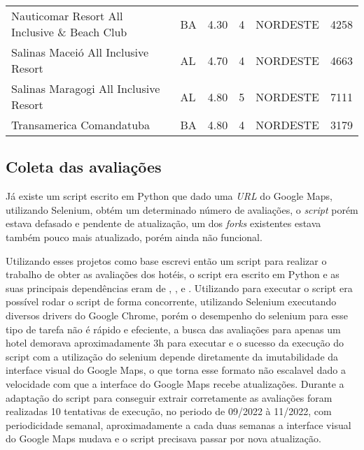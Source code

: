 \begin{table}[H]
{\begin{tabular}{llrrlr}
			Nauticomar Resort All Inclusive \& Beach Club & BA              & 4.30          & 4                 & NORDESTE        & 4258                       \\
			Salinas Maceió All Inclusive Resort           & AL              & 4.70          & 4                 & NORDESTE        & 4663                       \\
			Salinas Maragogi All Inclusive Resort         & AL              & 4.80          & 5                 & NORDESTE        & 7111                       \\
			Transamerica Comandatuba                      & BA              & 4.80          & 4                 & NORDESTE        & 3179
		\end{tabular}%
	}
\end{table}

\subsection{Coleta das avaliações}
\label{cap:metodologia:sec:conjunto_dados:sec:coleta}

Já existe um script escrito em Python \cite{gaspa93scrapper2023} que dado uma \emph{URL} do Google Maps, utilizando Selenium, obtém um determinado número de avaliações, o \emph{script} porém estava defasado e pendente de atualização, um dos \emph{forks} existentes  estava também pouco mais atualizado, porém ainda não funcional.

Utilizando esses projetos como base escrevi então um script para realizar o trabalho de obter as avaliações dos hotéis, o script era escrito em Python e as suas principais dependências eram de \cite{selenium2023}, ,  e . Utilizando  para executar o script era possível rodar o script de forma concorrente, utilizando Selenium executando diversos drivers do Google Chrome, porém o desempenho do selenium para esse tipo de tarefa não é rápido e efeciente, a busca das avaliações para apenas um hotel demorava aproximadamente 3h para executar e o sucesso da execução do script com a utilização do selenium depende diretamente da imutabilidade da interface visual do Google Maps, o que torna esse formato não escalavel dado a velocidade com que a interface do Google Maps recebe atualizações. Durante a adaptação do script para conseguir extrair corretamente as avaliações foram realizadas 10 tentativas de execução, no periodo de 09/2022 à 11/2022, com periodicidade semanal, aproximadamente a cada duas semanas a interface visual do Google Maps mudava e o script precisava passar por nova atualização.

